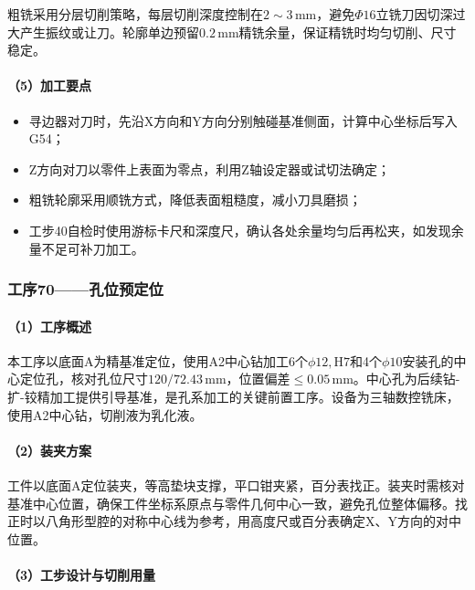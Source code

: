 \documentclass{xautCADreport}
\begin{document}
粗铣采用分层切削策略，每层切削深度控制在$2\sim3\,\mathrm{mm}$，避免$\Phi16$立铣刀因切深过大产生振纹或让刀。轮廓单边预留$0.2\,\mathrm{mm}$精铣余量，保证精铣时均匀切削、尺寸稳定。

\paragraph{（5）加工要点}

\begin{itemize}
  \item 寻边器对刀时，先沿X方向和Y方向分别触碰基准侧面，计算中心坐标后写入G54；
  \item Z方向对刀以零件上表面为零点，利用Z轴设定器或试切法确定；
  \item 粗铣轮廓采用顺铣方式，降低表面粗糙度，减小刀具磨损；
  \item 工步40自检时使用游标卡尺和深度尺，确认各处余量均匀后再松夹，如发现余量不足可补刀加工。
\end{itemize}

\subsubsection{工序70——孔位预定位}

\paragraph{（1）工序概述}

本工序以底面A为精基准定位，使用A2中心钻加工6个$\phi12,\mathrm{H7}$和4个$\phi10$安装孔的中心定位孔，核对孔位尺寸$120/72.43\,\mathrm{mm}$，位置偏差$\leq0.05\,\mathrm{mm}$。中心孔为后续钻-扩-铰精加工提供引导基准，是孔系加工的关键前置工序。设备为三轴数控铣床，使用A2中心钻，切削液为乳化液。

\paragraph{（2）装夹方案}

工件以底面A定位装夹，等高垫块支撑，平口钳夹紧，百分表找正。装夹时需核对基准中心位置，确保工件坐标系原点与零件几何中心一致，避免孔位整体偏移。找正时以八角形型腔的对称中心线为参考，用高度尺或百分表确定X、Y方向的对中位置。

\paragraph{（3）工步设计与切削用量}
\end{document}
